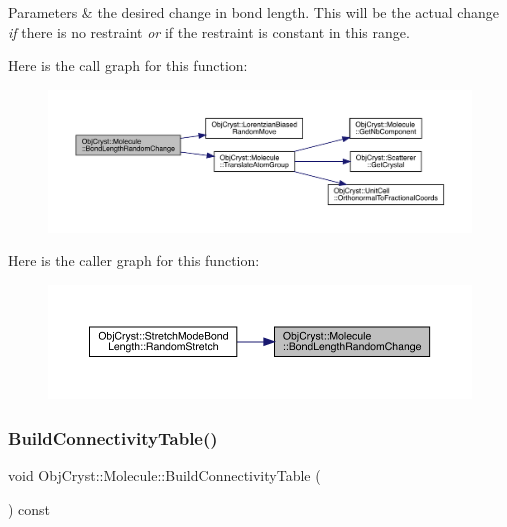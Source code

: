 \begin{DoxyParams}{Parameters}
{\em } & the desired change in bond length. This will be the actual change {\itshape if} there is no restraint {\itshape or} if the restraint is constant in this range. \\
\hline
\end{DoxyParams}
Here is the call graph for this function\+:
\nopagebreak
\begin{figure}[H]
\begin{center}
\leavevmode
\includegraphics[width=350pt]{class_obj_cryst_1_1_molecule_ad7bfddcdf21c1214c5a70c84fc54cdb0_cgraph}
\end{center}
\end{figure}
Here is the caller graph for this function\+:
\nopagebreak
\begin{figure}[H]
\begin{center}
\leavevmode
\includegraphics[width=350pt]{class_obj_cryst_1_1_molecule_ad7bfddcdf21c1214c5a70c84fc54cdb0_icgraph}
\end{center}
\end{figure}
\mbox{\label{class_obj_cryst_1_1_molecule_a45ed440475011a0ceb933f56751c11da}} 
\subsubsection{\texorpdfstring{BuildConnectivityTable()}{BuildConnectivityTable()}}
{\footnotesize\ttfamily void Obj\+Cryst\+::\+Molecule\+::\+Build\+Connectivity\+Table (\begin{DoxyParamCaption}{ }\end{DoxyParamCaption}) const}

